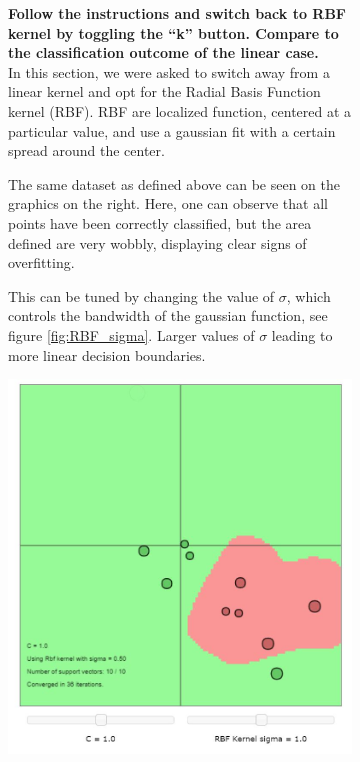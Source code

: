 \documentclass[11pt,oneside,a4paper]{article}
\begin{document}
 \begin{figure}[h!]
 	\centering
 	\begin{subfigure}[b]{.5\textwidth}
 	
 		\textbf{Follow the instructions and switch back to RBF kernel by toggling the “k” button. Compare to the classification outcome of the linear case.}\\
 		In this section, we were asked to switch away from a linear kernel and
 		opt for the Radial Basis Function kernel (RBF). RBF are localized
 		function, centered at a particular value, and use a gaussian fit with
 		a certain spread around the center. 
 		
 		The same dataset as defined above can be seen on the graphics on
 		the right. Here, one can observe that all points have been
 		correctly classified, but the area defined are very wobbly,
 		displaying clear signs of overfitting.  
 		
 		This can be tuned by changing the value of $\sigma$, which
 		controls the bandwidth of the gaussian function, see figure
 		\ref{fig:RBF_sigma}. Larger values of $\sigma$ leading to more
 		linear decision boundaries.
 	\end{subfigure}%
 	\begin{subfigure}{.5\textwidth}
 		\vspace{-185pt}
 		\centering
 		\includegraphics[width=0.9\linewidth]{../Figures/Default_RBF}
 	\end{subfigure}
 \end{figure}
 
\end{document}

